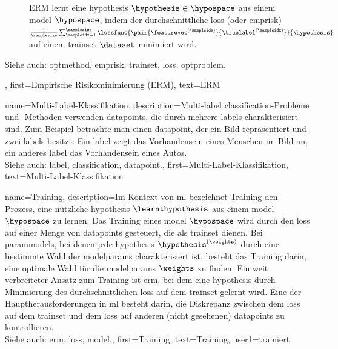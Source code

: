 {{{{{{\begin{figure}[H]
\begin{center}
\caption{ERM lernt eine \gls{hypothesis} $\hypothesis \in \hypospace$ 
aus einem \gls{model} $\hypospace$, indem der durchschnittliche \gls{loss} 
(oder \gls{emprisk}) $\frac{1}{\samplesize} \sum_{\sampleidx=1}^\samplesize \lossfunc{\pair{\featurevec^{(\sampleidx)}}{ \truelabel^{(\sampleidx)}}}{\hypothesis}$ 
auf einem \gls{trainset} $\dataset$ minimiert wird.}
\label{fig_erm_dict}
\end{center}
\end{figure}
		Siehe auch: \gls{optmethod}, \gls{emprisk}, \gls{trainset}, \gls{loss}, \gls{optproblem}.},
	first={Empirische Risikominimierung (ERM)},
	text={ERM} 
}


{name={Multi-Label-Klassifikation}, 
	description={Multi-\gls{label} 
		\gls{classification}-Probleme und -Methoden verwenden \glspl{datapoint}, 
		die durch mehrere \glspl{label} charakterisiert sind. Zum Beispiel betrachte man einen \gls{datapoint}, 
		der ein Bild repräsentiert und zwei \glspl{label} besitzt: Ein \gls{label} zeigt das Vorhandensein 
		eines Menschen im Bild an, ein anderes \gls{label} das Vorhandensein eines Autos.
				\\
		Siehe auch: \gls{label}, \gls{classification}, \gls{datapoint}.},
	first={Multi-Label-Klassifikation},
	text={Multi-Label-Klassifikation} 
}

{name={Training}, 
	description={Im Kontext von \gls{ml} bezeichnet Training den Prozess, 
	eine nützliche \gls{hypothesis} $\learnthypothesis$ aus einem \gls{model} $\hypospace$ zu lernen. 
	Das Training eines \gls{model} $\hypospace$ wird durch den \gls{loss} auf einer Menge von 
	\glspl{datapoint} gesteuert, die als \gls{trainset} dienen. Bei \glspl{parammodel}, 
	bei denen jede \gls{hypothesis} $\hypothesis^{(\weights)}$ durch eine bestimmte Wahl der 
	\glspl{modelparam} charakterisiert ist, besteht das Training darin, eine optimale Wahl für die 
	\glspl{modelparam} $\weights$ zu finden. Ein weit verbreiteter Ansatz zum Training ist \gls{erm}, 
	bei dem eine \gls{hypothesis} durch Minimierung des durchschnittlichen \gls{loss} auf dem 
	\gls{trainset} gelernt wird. Eine der Hauptherausforderungen in \gls{ml} besteht darin, die Diskrepanz 
	zwischen dem \gls{loss} auf dem \gls{trainset} und dem \gls{loss} auf anderen (nicht gesehenen) 
	\glspl{datapoint} zu kontrollieren.
				\\
		Siehe auch: \gls{erm}, \gls{loss}, \gls{model}.},
	first={Training},
	text={Training}, 
	user1={trainiert}
}

}}}}
